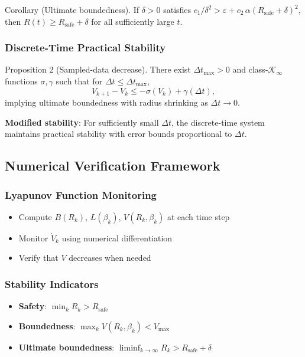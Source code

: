\documentclass[11pt,a4paper]{article}
\numberwithin{equation}{section}
\begin{document}
Corollary (Ultimate boundedness). If $\delta>0$ satisfies $c_1/\delta^2 > \varepsilon + c_2\,\alpha(R_{\text{safe}}+\delta)^2$, then $R(t)\ge R_{\text{safe}}+\delta$ for all sufficiently large $t$.

\subsubsection{Discrete-Time Practical Stability}

Proposition 2 (Sampled-data decrease). There exist $\Delta t_{\max}>0$ and class-$\mathcal{K}_\infty$ functions $\sigma,\gamma$ such that for $\Delta t\le \Delta t_{\max}$,
\[
V_{k+1}-V_k \le -\sigma(V_k)+\gamma(\Delta t),
\]
implying ultimate boundedness with radius shrinking as $\Delta t\to 0$.

\textbf{Modified stability}: For sufficiently small $\Delta t$, the discrete-time system maintains practical stability with error bounds proportional to $\Delta t$.

\subsection{Numerical Verification Framework}

\subsubsection{Lyapunov Function Monitoring}
\begin{itemize}
\item Compute $B(R_k)$, $L(\beta_k)$, $V(R_k, \beta_k)$ at each time step
\item Monitor $\dot{V}_k$ using numerical differentiation
\item Verify that $V$ decreases when needed
\end{itemize}

\subsubsection{Stability Indicators}
\begin{itemize}
\item \textbf{Safety}: $\min_k R_k > R_{\text{safe}}$
\item \textbf{Boundedness}: $\max_k V(R_k, \beta_k) < V_{\max}$
\item \textbf{Ultimate boundedness}: $\liminf_{k \to \infty} R_k > R_{\text{safe}} + \delta$
\end{itemize}
\end{document}
